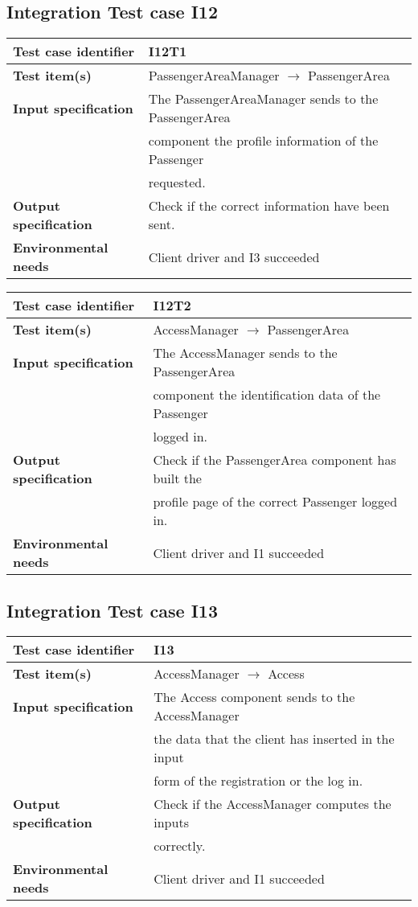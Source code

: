 	\subsection{Integration Test case I12}
		\begin{tabular}{ l l}
			\hline 		\textbf{Test case identifier} & I12T1 \\
			\hline		\textbf{Test item(s)}  & PassengerAreaManager $\rightarrow$ PassengerArea \\
			\hline		\textbf{Input specification} & The PassengerAreaManager sends to the PassengerArea\\ & component the profile information of the Passenger\\ & requested.\\
			\hline		\textbf{Output specification} & Check if the correct information have been sent.\\
			\hline		\textbf{Environmental needs} & Client driver and I3 succeeded\\
			\hline
		\end{tabular}
		
		\vspace{1cm}

		\begin{tabular}{ l l}
			\hline 		\textbf{Test case identifier} & I12T2 \\
			\hline		\textbf{Test item(s)}  & AccessManager $\rightarrow$ PassengerArea \\
			\hline		\textbf{Input specification} &  The AccessManager sends to the PassengerArea\\ & component the identification data of the Passenger\\ & logged in.\\
			\hline		\textbf{Output specification} & Check if the PassengerArea component has built the\\ & profile page of the correct Passenger logged in.\\
			\hline		\textbf{Environmental needs} & Client driver and I1 succeeded\\
			\hline
		\end{tabular}
		
	\subsection{Integration Test case I13}
		\begin{tabular}{ l l}
			\hline 		\textbf{Test case identifier} & I13 \\
			\hline		\textbf{Test item(s)}  & AccessManager $\rightarrow$ Access \\
			\hline		\textbf{Input specification} & The Access component sends to the AccessManager \\ & the data that the client has inserted in the input \\ & form of  the registration or the log in.\\
			\hline		\textbf{Output specification} & Check if the AccessManager computes the inputs\\ & correctly.\\
			\hline		\textbf{Environmental needs} & Client driver and I1 succeeded\\
			\hline
		\end{tabular}
